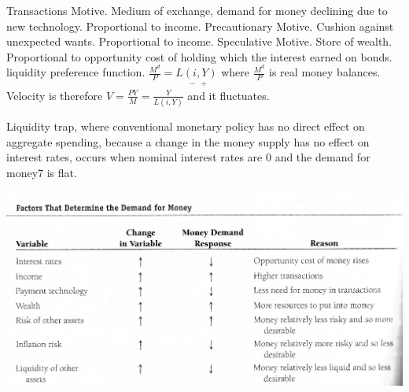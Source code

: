 \documentclass[12pt]{examnotes}
\begin{document}
 Transactions Motive. Medium of exchange, demand for money declining due to new technology. Proportional to income.
 Precautionary Motive. Cushion against unexpected wants. Proportional to income.
 Speculative Motive. Store of wealth. Proportional to opportunity cost of holding which the interest earned on bonds.
\ra liquidity preference function. $\frac{M^d}{P} = \underset{\, \ - \ +}{L(i,Y)}$ where $\frac{M^d}{P}$ is real money balances.
\ra Velocity is therefore $V=\frac{PY}{M}= \frac{Y}{L(i,Y)}$ and it fluctuates.

\vspace{6pt}
\ra Liquidity trap, where conventional monetary policy has no direct effect on aggregate spending, because a change in the money supply has no effect on interest rates, occurs when nominal interest rates are 0 and the demand for money7 is flat.

\includegraphics[scale=0.5]{./imgs/201.jpg}

\end{document}
